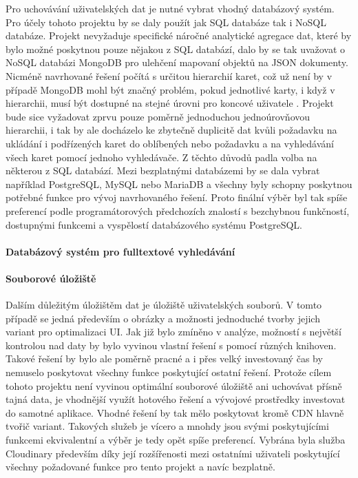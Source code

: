 \begin{itemize}
\begin{itemize}
			Pro uchovávání uživatelských dat je nutné vybrat vhodný databázový systém.
			Pro účely tohoto projektu by se daly použít jak \ac{SQL} databáze tak i \ac{NoSQL} databáze.
			Projekt nevyžaduje specifické náročné analytické agregace dat, které by bylo možné poskytnou pouze nějakou z
			\ac{SQL} databází, dalo by se tak uvažovat o \ac{NoSQL} databázi MongoDB pro ulehčení mapovaní objektů na
			\ac{JSON} dokumenty.
			Nicméně navrhované řešení počítá s určitou hierarchií karet, což už není by v případě MongoDB mohl být značný
			problém, pokud jednotlivé karty, i když v hierarchii, musí být dostupné na stejné úrovni pro koncové uživatele
			\cite{why_you_should_never_use_mongodb}.
			Projekt bude sice vyžadovat zprvu pouze poměrně jednoduchou jednoúrovňovou hierarchii, i tak by ale docházelo ke
			zbytečně duplicitě dat kvůli požadavku na ukládání i podřízených karet do oblíbených nebo požadavku a na vyhledávání
			všech karet pomocí jednoho vyhledávače.
			Z těchto důvodů padla volba na některou z \ac{SQL} databází.
			Mezi bezplatnými databázemi by se dala vybrat například PostgreSQL, MySQL nebo MariaDB a všechny byly schopny
			poskytnou potřebné funkce pro vývoj navrhovaného řešení.
			Proto finální výběr byl tak spíše preferencí podle programátorových předchozích znalostí s bezchybnou funkčností,
			dostupnými funkcemi a vyspělostí databázového systému PostgreSQL.

			\paragraph{Databázový systém pro fulltextové vyhledávání}


			\paragraph{Souborové úložiště}

			Dalším důležitým úložištěm dat je úložiště uživatelských souborů.
			V tomto případě se jedná především o obrázky a možnosti jednoduché tvorby jejich variant pro optimalizaci \ac{UI}.
			Jak již bylo zmíněno v analýze, možností s největší kontrolou nad daty by bylo vyvinou vlastní řešení s pomocí
			různých knihoven.
			Takové řešení by bylo ale poměrně pracné a i přes velký investovaný čas by nemuselo poskytovat všechny funkce
			poskytující ostatní řešení.
			Protože cílem tohoto projektu není vyvinou optimální souborové úložiště ani uchovávat přísně tajná data, je
			vhodnější využít hotového řešení a vývojové prostředky investovat do samotné aplikace.
			Vhodné řešení by tak mělo poskytovat kromě \ac{CDN} hlavně tvořič variant.
			Takových služeb je vícero a mnohdy jsou svými poskytujícími funkcemi ekvivalentní a výběr je tedy opět spíše
			preferencí.
			Vybrána byla služba Cloudinary především díky její rozšířenosti mezi ostatními uživateli poskytující všechny
			požadované funkce pro tento projekt a navíc bezplatně.


\end{itemize}
\end{itemize}
